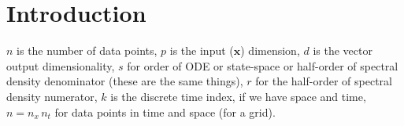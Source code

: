 \documentclass[journal]{IEEEtran}
\newcommand{\simo}[1]{{\color{red}#1}}
\begin{document}
\section{Introduction}


\simo{{\em Notation:} $n$ is the number of data points, $p$ is the input ($\mathbf{x}$) dimension, $d$ is the vector output dimensionality, $s$ for order of ODE or state-space or half-order of spectral density denominator (these are the same things), $r$ for the half-order of spectral density numerator, $k$ is the discrete time index, if we have space and time, $n = n_x \, n_t$ for data points in time and space (for a grid).}
\end{document}
